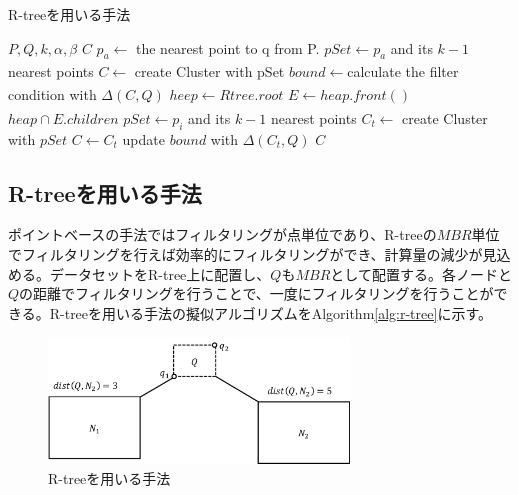 \documentclass{deimj}
\begin{document}
\begin{algorithm}                      
\caption{R-treeを用いる手法}         
\label{alg:r-tree}
\begin{algorithmic}[1]                  
\renewcommand{\algorithmicrequire}{\textbf{Input:}}
\renewcommand{\algorithmicensure}{\textbf{Output:}}
\REQUIRE $P,Q,k,\alpha, \beta$
\ENSURE $C$
\STATE $p_a \xleftarrow[]{}$ the nearest point to q from P.
\STATE $pSet \xleftarrow{} p_a$ and its $k-1$ nearest points
\STATE $C \xleftarrow[]{}$ create Cluster with pSet
\STATE $bound \xleftarrow[]{} $calculate the filter condition with $\Delta(C,Q)$
\STATE $heep \xleftarrow[]{} Rtree.root$
\STATE $E \xleftarrow[]{}heap.front()$
\STATE $heap \cap E.children$
\ENDIF
{}
\STATE $pSet \xleftarrow{} p_i$ and its $k-1$ nearest points
\STATE $C_t \xleftarrow{}$ create Cluster with $pSet$
\STATE $C \xleftarrow{} C_t$
\STATE update $bound$ with $\Delta(C_t,Q)$
\ENDIF
\ENDIF
\ENDFOR
\ENDIF
\ENDIF
\ENDWHILE
\RETURN $C$
\end{algorithmic}
\end{algorithm}

\subsection{R-treeを用いる手法}
ポイントベースの手法ではフィルタリングが点単位であり、R-treeの$MBR$単位でフィルタリングを行えば効率的にフィルタリングができ、計算量の減少が見込める。データセットをR-tree上に配置し、$Q$も$MBR$として配置する。各ノードと$Q$の距離でフィルタリングを行うことで、一度にフィルタリングを行うことができる。R-treeを用いる手法の擬似アルゴリズムをAlgorithm\ref{alg:r-tree}に示す。

\begin{figure}[H]
	\centering
    \includegraphics[width=8cm]{images/sol-r-tree.pdf}
    \caption{R-treeを用いる手法}
    \label{fig:sol-r-tree}
\end{figure}
\end{document}
